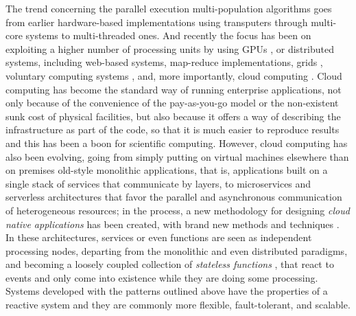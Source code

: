\documentclass[review]{elsarticle}
\begin{document}
The trend concerning the parallel execution multi-population algorithms goes from
earlier hardware-based implementations using transputers
\cite{gorges1990explicit} through 
multi-core systems \cite{Serrano2008,lai2019adaptive} to multi-threaded \cite{merelo2019scaling} ones.
And recently the focus has been on exploiting a higher number of processing
units by using GPUs \cite{tan2015survey,li2007efficient}, or distributed
systems, including web-based \cite{JSON} systems,
map-reduce \cite{fazenda2012} implementations,  grids \cite{munawar2010design,Gonzalez09},
voluntary computing systems \cite{MilkyWay,merelo2016nodio}, 
and, more importantly, cloud computing
\cite{GValdez2015,salza2019speed,valenzuela2015implementing,FlexGP}. Cloud computing has become the standard way of running
enterprise applications, not only because of the convenience of the
pay-as-you-go model or the non-existent sunk cost of physical facilities, but also because
it offers a way of describing the infrastructure as part of the code, so that it
is much easier to reproduce results and this has been a boon for scientific
computing.  However,  cloud computing has also been evolving, going from simply
putting on virtual machines elsewhere than on premises old-style monolithic applications, that is, applications
built on a single stack of services that communicate by layers, to microservices
\cite{microservices} and serverless architectures \cite{varghese2018next,Varghese2018849} that favor the parallel and asynchronous communication of
heterogeneous resources; in the process, a new methodology for designing {\em cloud
native applications} has been created, with brand new methods and
techniques \cite{Baldini2016287}. In these architectures, services or even
functions are seen as independent processing nodes, departing from the monolithic
and even distributed paradigms, and becoming a loosely coupled collection of {\em
stateless functions} \cite{malawski2017serverless}, that react to events and
only come into existence while they are doing some processing.
Systems developed with the patterns outlined above have the
properties of a reactive system \cite{boner2014reactive} and they are commonly
more flexible, fault-tolerant, and scalable. %
\end{document}

